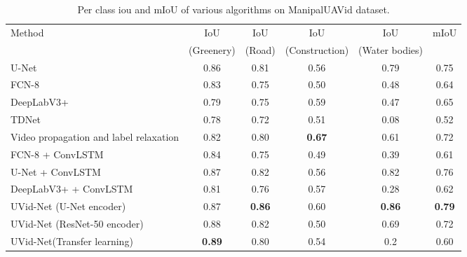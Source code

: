 \documentclass[journal]{IEEEtran}
\begin{document}
\begin{table*}[!h]
	\begin{center}
		\begin{tabular}{|l|c|c|c|c|c|}
			\hline
			Method & IoU &IoU &IoU&IoU&mIoU \\
			&(Greenery)&(Road)&(Construction)& (Water bodies)&\\
			\hline\hline
			U-Net \cite{2} &0.86	&0.81	&0.56	&0.79	&0.75	 \\
			\hline
			FCN-8 \cite{4} &0.83 &0.75&0.50	&0.48&0.64 \\
			\hline
			DeepLabV3+ \cite{33} & 0.79&0.75& 0.59&0.47	&0.65\\
			\hline
			\hline
			TDNet \cite{hu2020temporally} & 0.78	&0.72&0.51&	0.08& 0.52\\
			\hline
			Video propagation and label relaxation \cite{22}  &0.82  &0.80 &\textbf{0.67}&0.61 &0.72\\
			\hline 
			FCN-8 + ConvLSTM \cite{wang2019deep}  &0.84 &0.75 &0.49&0.39 &0.61 \\
			\hline 
			U-Net + ConvLSTM &0.87 &0.82 &0.56 &0.82&0.76\\
			\hline
			DeepLabV3+ + ConvLSTM &0.81 &0.76 &0.57 &0.28 &0.62\\
			\hline
			\hline
			UVid-Net (U-Net encoder)&0.87&	\textbf{0.86}&	0.60&\textbf{0.86}&	\textbf{0.79}\\
			\hline
			UVid-Net (ResNet-50 encoder) &0.88	&0.82	&	0.50&0.69	&0.72\\
			\hline
			UVid-Net(Transfer learning) &\textbf{ 0.89}& 0.80 &0.54&0.2&0.60\\\hline
		\end{tabular}
	\end{center}
	\caption{Per class iou and mIoU of various algorithms on ManipalUAVid dataset.}
	\label{table2}
\end{table*}
\end{document}
